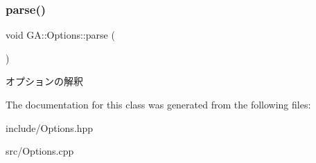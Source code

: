 \subsubsection{\texorpdfstring{parse()}{parse()}}
{\footnotesize\ttfamily void G\+A\+::\+Options\+::parse (\begin{DoxyParamCaption}{ }\end{DoxyParamCaption})\hspace{0.3cm}{\ttfamily [virtual]}}



オプションの解釈 



The documentation for this class was generated from the following files\+:\begin{DoxyCompactItemize}
\item 
include/Options.\+hpp\item 
src/Options.\+cpp\end{DoxyCompactItemize}
